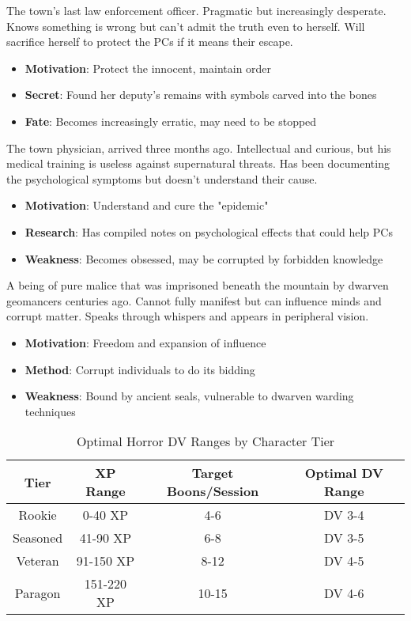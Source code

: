 \documentclass[11pt]{article}
\begin{document}
\begin{description}[leftmargin=*]
\item[Marshal Elena Vasquez] The town's last law enforcement officer. Pragmatic but increasingly desperate. Knows something is wrong but can't admit the truth even to herself. Will sacrifice herself to protect the PCs if it means their escape.
\begin{itemize}
\item \textbf{Motivation}: Protect the innocent, maintain order
\item \textbf{Secret}: Found her deputy's remains with symbols carved into the bones
\item \textbf{Fate}: Becomes increasingly erratic, may need to be stopped
\end{itemize}

\item[Dr. Samuel Crowell] The town physician, arrived three months ago. Intellectual and curious, but his medical training is useless against supernatural threats. Has been documenting the psychological symptoms but doesn't understand their cause.
\begin{itemize}
\item \textbf{Motivation}: Understand and cure the "epidemic"
\item \textbf{Research}: Has compiled notes on psychological effects that could help PCs
\item \textbf{Weakness}: Becomes obsessed, may be corrupted by forbidden knowledge
\end{itemize}

\item[The Entity (Ancient in the Dark)] A being of pure malice that was imprisoned beneath the mountain by dwarven geomancers centuries ago. Cannot fully manifest but can influence minds and corrupt matter. Speaks through whispers and appears in peripheral vision.
\begin{itemize}
\item \textbf{Motivation}: Freedom and expansion of influence
\item \textbf{Method}: Corrupt individuals to do its bidding
\item \textbf{Weakness}: Bound by ancient seals, vulnerable to dwarven warding techniques
\end{itemize}
\end{description}

\begin{table}[htbp]
\centering
\caption{Optimal Horror DV Ranges by Character Tier}
\begin{tabular}{|c|c|c|c|}
\hline
\textbf{Tier} & \textbf{XP Range} & \textbf{Target Boons/Session} & \textbf{Optimal DV Range} \\
\hline
Rookie & 0-40 XP & 4-6 & DV 3-4 \\
Seasoned & 41-90 XP & 6-8 & DV 3-5 \\
Veteran & 91-150 XP & 8-12 & DV 4-5 \\
Paragon & 151-220 XP & 10-15 & DV 4-6 \\
\hline
\end{tabular}
\end{table}
\end{document}
